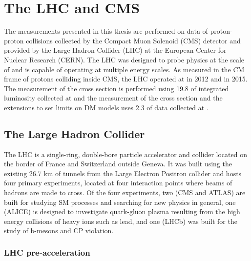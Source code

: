 
\chapter{The LHC and CMS}\label{sec:experiment}

The measurements presented in this thesis are performed
 on data of proton-proton collisions collected %
 by the Compact Muon Solenoid (CMS) detector and
 provided by the
 Large Hadron Collider (LHC) at the 
 European Center for Nuclear Research (CERN).
The LHC was designed to probe physics at the 
 scale of \TeV and is capable of operating at
 multiple energy scales.
As measured in the CM frame
 of protons colliding inside CMS,
 the LHC operated at
  \TeV in 2012 and  \TeV in 2015.
The measurement of the \ppwbb cross section 
 is performed using 19.8 \fbinv of integrated luminosity
 collected at  \TeV and 
 the measurement of the \ppzgnng cross section
 and the extensions to set limits on DM models 
 uses 2.3 \fbinv of data collected at  \TeV. 

\section{The Large Hadron Collider}
The LHC is a single-ring, double-bore 
 particle accelerator and collider located 
 on the border of France and Switzerland outside Geneva.
It was built using the existing 26.7 km of tunnels from the
 Large Electron Positron collider and hosts
 four primary experiments, located at four
 interaction points where beams of hadrons are made to cross.
Of the four experiments, two (CMS and ATLAS) are built for 
 studying SM processes and searching for new physics in general,
 one (ALICE) is designed to investigate 
 quark-gluon plasma resulting from 
 the high energy collisions of heavy ions such as lead,
 and one (LHCb) was built for the study of
 b-mesons and CP violation.

\subsection{LHC pre-acceleration}

